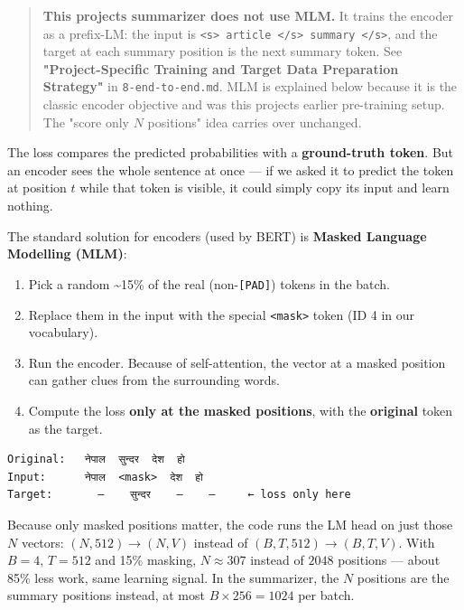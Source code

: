 \documentclass[11pt,a4paper,oneside]{report}
\providecommand{\tightlist}{\setlength{\itemsep}{0pt}\setlength{\parskip}{0pt}}
\begin{document}
\begin{quote}
\textbf{This project\textquotesingle s summarizer does not use MLM.} It trains the encoder as a prefix-LM: the input is \texttt{\textless{}s\textgreater{}\ article\ \textless{}/\allowbreak{}s\textgreater{}\ summary\ \textless{}/\allowbreak{}s\textgreater{}}, and the target at each summary position is the next summary token. See \textbf{"Project-Specific Training and Target Data Preparation Strategy"} in \texttt{8-end-to-end.\allowbreak{}md}. MLM is explained below because it is the classic encoder objective and was this project\textquotesingle s earlier pre-training setup. The "score only \(N\) positions" idea carries over unchanged.
\end{quote}

The loss compares the predicted probabilities with a \textbf{ground-truth token}. But an encoder sees the whole sentence at once --- if we asked it to predict the token at position \(t\) while that token is visible, it could simply copy its input and learn nothing.

The standard solution for encoders (used by BERT) is \textbf{Masked Language Modelling (MLM)}:

\begin{enumerate}
\def\labelenumi{\arabic{enumi}.}
\tightlist
\item
  Pick a random \textasciitilde15\% of the real (non-\texttt{{[}PAD{]}}) tokens in the batch.
\item
  Replace them in the input with the special \texttt{\textless{}mask\textgreater{}} token (ID 4 in our vocabulary).
\item
  Run the encoder. Because of self-attention, the vector at a masked position can gather clues from the surrounding words.
\item
  Compute the loss \textbf{only at the masked positions}, with the \textbf{original} token as the target.
\end{enumerate}

\begin{Verbatim}[fontsize=\small]
Original:   नेपाल  सुन्दर  देश  हो
Input:      नेपाल  <mask>  देश  हो
Target:       –    सुन्दर    –    –     ← loss only here
\end{Verbatim}

Because only masked positions matter, the code runs the LM head on just those \(N\) vectors: \((N, 512) \rightarrow (N, V)\) instead of \((B, T, 512) \rightarrow (B, T, V)\). With \(B = 4\), \(T = 512\) and 15\% masking, \(N \approx 307\) instead of \(2048\) positions --- about 85\% less work, same learning signal. In the summarizer, the \(N\) positions are the summary positions instead, at most \(B \times 256 = 1024\) per batch.
\end{document}
